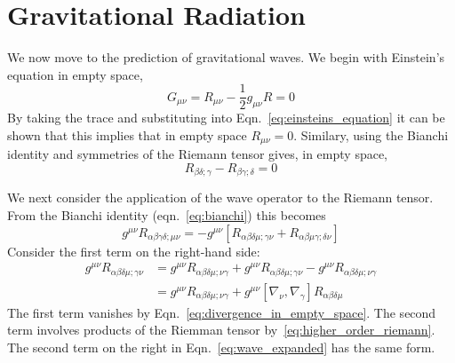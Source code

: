 \section{Gravitational Radiation}
\label{sec:gravitational_radiation}

We now move to the prediction of gravitational waves.  We begin with
Einstein's equation in empty space,
%
\begin{equation*}
G_{\mu\nu} = R_{\mu\nu} - \frac{1}{2} g_{\mu\nu} R = 0
\end{equation*}
%
By taking the trace and substituting into Eqn.~\ref{eq:einsteins_equation}
it can be shown that this implies that in empty space $R_{\mu\nu} =
0$.  Similary, using the Bianchi identity and symmetries of the Riemann tensor gives,
in empty space,
%
\begin{equation}
\label{eq:divergence_in_empty_space}
R_{\beta\delta;\gamma}  -R_{\beta\gamma;\delta} = 0
\end{equation}

We next consider the application of the wave operator to the Riemann
tensor.  From the Bianchi identity (eqn.~\ref{eq:bianchi}) this becomes
%
\begin{equation*}
\label{eq:wave_expanded}
g^{\mu\nu} R_{\alpha\beta\gamma\delta;\mu\nu}
= - g^{\mu\nu}
\left[R_{\alpha\beta\delta\mu;\gamma\nu}
+ R_{\alpha\beta\mu\gamma;\delta\nu} \right]
\end{equation*}
%
Consider the first term on the right-hand side:
%
\begin{align*}
g^{\mu\nu} R_{\alpha\beta\delta\mu;\gamma\nu}
&= g^{\mu\nu} R_{\alpha\beta\delta\mu;\nu\gamma}
+ g^{\mu\nu} R_{\alpha\beta\delta\mu;\gamma\nu}
- g^{\mu\nu} R_{\alpha\beta\delta\mu;\nu\gamma} \\
&= g^{\mu\nu} R_{\alpha\beta\delta\mu;\nu\gamma}
+ g^{\mu\nu} 
\left[\nabla_\nu,\nabla_\gamma\right] R_{\alpha\beta\delta\mu}
\end{align*}
%
The first term vanishes by
Eqn.~\ref{eq:divergence_in_empty_space}.  The second term involves
products of the Riemman tensor by~\ref{eq:higher_order_riemann}.  The
second term on the right in Eqn.~\ref{eq:wave_expanded} has the
same form.


